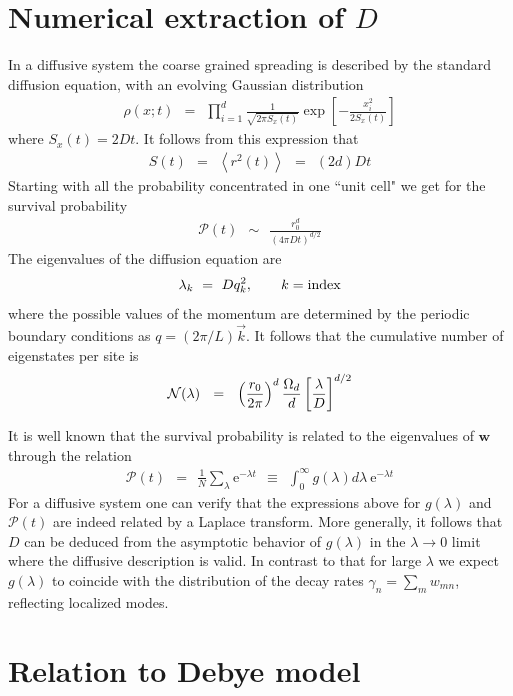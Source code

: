 \documentclass[aps,pre,floats,floatfix,twocolumn]{revtex4}
\newcommand{\eexp}{\mbox{e}^}
\newcommand{\mylabel}[1]{\label{#1}}
\newcommand{\beq}{\begin{eqnarray}}
\newcommand{\eeq}{\end{eqnarray}}
\newcommand{\be}[1]{\begin{eqnarray}\ifthenelse{#1=-1}
{\nonumber}{\ifthenelse{#1=0}{}{\mylabel{e#1}}}}
\begin{document}
\section{Numerical extraction of $D$}
\label{diff}

In a diffusive system the coarse grained spreading 
is described by the standard diffusion equation,
with an evolving Gaussian distribution  
%  
\beq
\rho(x;t) \ \ = \ \ \prod_{i=1}^d \frac{1}{\sqrt{2\pi S_x(t)}} 
\exp\left[-\frac{x_i^2}{2S_x(t)} \right]
\eeq
%
where $S_x(t)=2Dt$. It follows from this expression that 
% 
\beq
S(t) \ \ = \ \ \left\langle r^2(t) \right\rangle  \ \ = \ \ (2d)Dt
\eeq
%
Starting with all the probability concentrated 
in one ``unit cell" we get for the survival probability 
%
\beq
\mathcal{P}(t) \ \ \sim \ \ \frac{r_0^d}{\left({4\pi D t}\right)^{d/2}} 
\eeq
%
The eigenvalues of the diffusion equation are 
%
\be{323}
\lambda_k \ = \ Dq_k^2, 
\ \ \ \ \ \  k=\text{index}
\eeq
% 
where the possible values of the momentum are determined  
by the periodic boundary conditions as $q=(2\pi/L)\vec{k}$. 
It follows that the cumulative number of eigenstates 
per site is  
%
\be{324}
\mathcal{N}(\lambda) \ \ = \ \ 
\left(\frac{r_0}{2\pi}\right)^d
\frac{\Omega_d}{d}
\left[\frac{\lambda}{D}\right]^{d/2}
\eeq


It is well known that the survival probability 
is related to the eigenvalues of $\bm{w}$ through the relation
%
\beq 
\mathcal{P}(t) \ \ = \ \ \frac{1}{N}\sum_\lambda \eexp{-\lambda t} 
\ \ \equiv \ \ \int_0^{\infty} g(\lambda)d\lambda \ \eexp{-\lambda t}
\eeq
%
For a diffusive system one can verify that 
the expressions above for $g(\lambda)$ and $\mathcal{P}(t)$ 
are indeed related by a Laplace transform.  
%
More generally, it follows that $D$ can be deduced from 
the asymptotic behavior of $g(\lambda)$
in the ${\lambda\rightarrow 0}$ limit  
where the diffusive description is valid.
%
In contrast to that for large $\lambda$ we expect $g(\lambda)$ to coincide 
with the distribution of the decay rates $\gamma_n=\sum_{m}w_{mn}$, 
reflecting localized modes.




\section{Relation to Debye model}
\label{deb}
\end{document}
